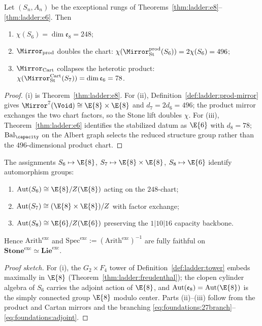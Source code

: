 \begin{lemma}\label{lem:ladder:chart-sync}
Let $(S_n,A_n)$ be the exceptional rungs of
Theorems~\ref{thm:ladder:e8}--\ref{thm:ladder:e6}. Then
\begin{enumerate}[label=(\roman*),leftmargin=*]
  \item $\chi(S_6)=\dim\mathfrak{e}_8=248$;
  \item $\Mirror_{\mathrm{prod}}$ doubles the chart:
    $\chi(\Mirror_{\mathrm{St}}^{\mathrm{prod}}(S_6))=2\chi(S_6)=496$;
  \item $\Mirror_{\mathrm{Cart}}$ collapses the heterotic product:
    $\chi(\Mirror_{\mathrm{St}}^{\mathrm{Cart}}(S_7))=\dim\mathfrak{e}_6=78$.
\end{enumerate}
\end{lemma}

\begin{proof}
(i) is Theorem~\ref{thm:ladder:e8}. For (ii),
Definition~\ref{def:ladder:prod-mirror} gives
$\Mirror^7(\Void)\cong\E{8}\times\E{8}$ and
$d_7=2d_6=496$; the product mirror exchanges the two chart factors, so the
Stone lift doubles $\chi$. For (iii),
Theorem~\ref{thm:ladder:e6} identifies the stabilized datum as $\E{6}$ with
$d_8=78$; $\mathrm{Bal}_\capacity$ on the Albert graph selects the reduced
structure group rather than the $496$-dimensional product chart.
\end{proof}

\begin{lemma}
\label{lem:ladder:aut-sync-exc}
The assignments $S_6\mapsto\E{8}$, $S_7\mapsto\E{8}\times\E{8}$,
$S_8\mapsto\E{6}$ identify automorphism groups:
\begin{enumerate}[label=(\roman*),leftmargin=*]
  \item $\mathrm{Aut}(S_6)\cong\E{8}/Z(\E{8})$ acting on the $248$-chart;
  \item $\mathrm{Aut}(S_7)\cong(\E{8}\times\E{8})/Z$ with factor exchange;
  \item $\mathrm{Aut}(S_8)\cong\E{6}/Z(\E{6})$ preserving the $1|10|16$
    capacity backbone.
\end{enumerate}
Hence $\mathrm{Arith}^{\mathrm{exc}}$ and
$\mathrm{Spec}^{\mathrm{exc}}:=(\mathrm{Arith}^{\mathrm{exc}})^{-1}$ are fully
faithful on $\mathbf{Stone}^{\mathrm{exc}}\simeq\mathbf{Lie}^{\mathrm{exc}}$.
\end{lemma}

\begin{proof}[Proof sketch]
For (i), the $G_2\times F_4$ tower of Definition~\ref{def:ladder:tower} embeds
maximally in $\E{8}$ (Theorem~\ref{thm:ladder:freudenthal}); the clopen
cylinder algebra of $S_6$ carries the adjoint action of $\E{8}$, and
$\mathrm{Aut}(\mathfrak{e}_8)=\mathrm{Aut}(\E{8})$ is the simply connected
group $\E{8}$ modulo center. Parts (ii)--(iii) follow from the product and
Cartan mirrors and the branching
\eqref{eq:foundations:27branch}--\eqref{eq:foundations:adjoint}.
\end{proof}

